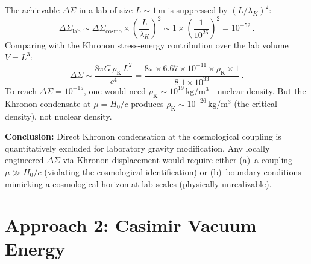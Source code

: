 \documentclass[prd,twocolumn,superscriptaddress,longbibliography,floatfix]{revtex4-2}
\newcommand{\DSigma}{\Delta\Sigma}
\newcommand{\rhoK}{\rho_{\mathrm{K}}}
\begin{document}
The achievable $\DSigma$ in a lab of size $L \sim 1\,\mathrm{m}$
is suppressed by $(L/\lambda_K)^2$:
\begin{equation}
  \DSigma_{\mathrm{lab}} \sim \DSigma_{\mathrm{cosmo}}
  \times \left(\frac{L}{\lambda_K}\right)^2
  \sim 1 \times \left(\frac{1}{10^{26}}\right)^2
  = 10^{-52}\,.
  \label{eq:khronon-lab}
\end{equation}
Comparing with the Khronon stress-energy contribution over the
lab volume $V = L^3$:
\begin{equation}
  \DSigma \sim \frac{8\pi G\,\rhoK\,L^2}{c^4}
  = \frac{8\pi \times 6.67 \times 10^{-11} \times \rhoK \times 1}
  {8.1 \times 10^{33}}\,.
  \label{eq:dsigma-energy}
\end{equation}
To reach $\DSigma = 10^{-15}$, one would need
$\rhoK \sim 10^{19}\,\mathrm{kg/m^3}$---nuclear density.  But the
Khronon condensate at $\mu = H_0/c$ produces
$\rhoK \sim 10^{-26}\,\mathrm{kg/m^3}$ (the critical density),
not nuclear density.

\textbf{Conclusion:} Direct Khronon condensation at the cosmological
coupling is quantitatively excluded for laboratory gravity
modification.  Any locally engineered $\DSigma$ via Khronon
displacement would require either (a)~a coupling $\mu \gg H_0/c$
(violating the cosmological identification) or (b)~boundary conditions
mimicking a cosmological horizon at lab scales (physically unrealizable).

\section{Approach 2: Casimir Vacuum Energy}
\label{sec:casimir}
\end{document}
